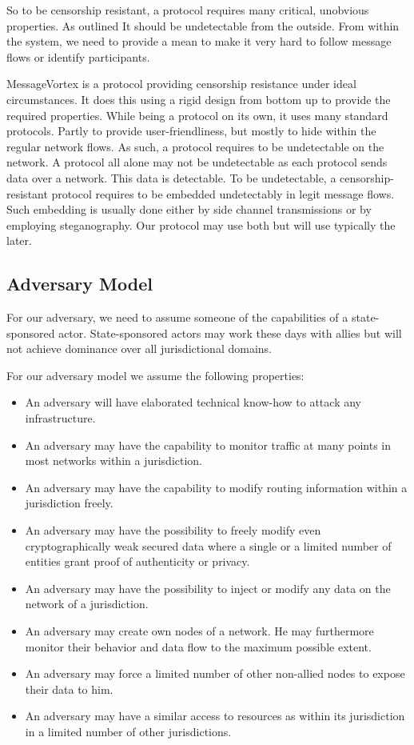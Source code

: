 \documentclass[10pt,journal,compsoc]{IEEEtran}
\begin{document}
So to be censorship resistant, a protocol requires many critical, unobvious properties. As outlined It should be undetectable from the outside. From within the system, we need to provide a mean to make it very hard to follow message flows or identify participants.

MessageVortex is a protocol providing censorship resistance under ideal circumstances. It does this using a rigid design from bottom up to provide the required properties. While being a protocol on its own, it uses many standard protocols. Partly to provide user-friendliness, but mostly to hide within the regular network flows. As such, a protocol requires to be undetectable on the network. A protocol all alone may not be undetectable as each protocol sends data over a network. This data is detectable. To be undetectable, a censorship-resistant protocol requires to be embedded undetectably in legit message flows. Such embedding is usually done either by side channel transmissions or by employing steganography. Our protocol may use both but will use typically the later. 

\subsection{Adversary Model}
For our adversary, we need to assume someone of the capabilities of a state-sponsored actor. State-sponsored actors may work these days with allies but will not achieve dominance over all jurisdictional domains.

For our adversary model we assume the following properties:
\begin{itemize}
	\item An adversary will have elaborated technical know-how to attack any infrastructure.
	\item An adversary may have the capability to monitor traffic at many points in most networks within a jurisdiction.
	\item An adversary may have the capability to modify routing information within a jurisdiction freely.
	\item An adversary may have the possibility to freely modify even cryptographically weak secured data where a single or a limited number of entities grant proof of authenticity or privacy.
	\item An adversary may have the possibility to inject or modify any data on the network of a jurisdiction.
	\item An adversary may create own nodes of a network. He may furthermore monitor their behavior and data flow to the maximum possible extent.
	\item An adversary may force a limited number of other non-allied nodes to expose their data to him.
	\item An adversary may have a similar access to resources as within its jurisdiction in a limited number of other jurisdictions.
\end{itemize}
\end{document}
